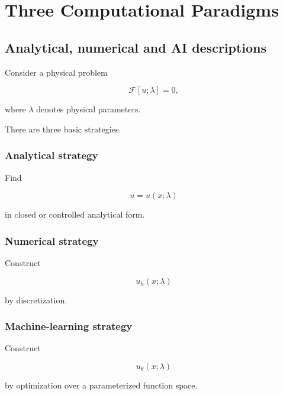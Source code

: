\documentclass[11pt,a4paper,oneside]{book}
\begin{document}
\chapter{Three Computational Paradigms}

\section{Analytical, numerical and AI descriptions}

Consider a physical problem

\begin{equation}
\mathcal{F}[u;\lambda]=0,
\end{equation}

where $\lambda$ denotes physical parameters.

There are three basic strategies.

\subsection{Analytical strategy}

Find

\begin{equation}
u=u(x;\lambda)
\end{equation}

in closed or controlled analytical form.

\subsection{Numerical strategy}

Construct

\begin{equation}
u_h(x;\lambda)
\end{equation}

by discretization.

\subsection{Machine-learning strategy}

Construct

\begin{equation}
u_\theta(x;\lambda)
\end{equation}

by optimization over a parameterized function space.
\end{document}
